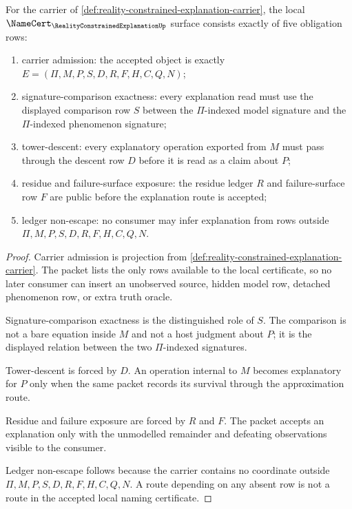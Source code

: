 \begin{theorem}
\label{thm:reality-constrained-explanation-namecert-obligations}
For the carrier of \autoref{def:reality-constrained-explanation-carrier}, the local $\NameCert_{\RealityConstrainedExplanationUp}$ surface consists exactly of five obligation rows:
\begin{enumerate}
\item carrier admission: the accepted object is exactly $E=(\Pi,M,P,S,D,R,F,H,C,Q,N)$;
\item signature-comparison exactness: every explanation read must use the displayed comparison row $S$ between the $\Pi$-indexed model signature and the $\Pi$-indexed phenomenon signature;
\item tower-descent: every explanatory operation exported from $M$ must pass through the descent row $D$ before it is read as a claim about $P$;
\item residue and failure-surface exposure: the residue ledger $R$ and failure-surface row $F$ are public before the explanation route is accepted;
\item ledger non-escape: no consumer may infer explanation from rows outside $\Pi,M,P,S,D,R,F,H,C,Q,N$.
\end{enumerate}
\end{theorem}
\begin{proof}
Carrier admission is projection from \autoref{def:reality-constrained-explanation-carrier}. The packet lists the only rows available to the local certificate, so no later consumer can insert an unobserved source, hidden model row, detached phenomenon row, or extra truth oracle.

Signature-comparison exactness is the distinguished role of $S$. The comparison is not a bare equation inside $M$ and not a host judgment about $P$; it is the displayed relation between the two $\Pi$-indexed signatures.

Tower-descent is forced by $D$. An operation internal to $M$ becomes explanatory for $P$ only when the same packet records its survival through the approximation route.

Residue and failure exposure are forced by $R$ and $F$. The packet accepts an explanation only with the unmodelled remainder and defeating observations visible to the consumer.

Ledger non-escape follows because the carrier contains no coordinate outside $\Pi,M,P,S,D,R,F,H,C,Q,N$. A route depending on any absent row is not a route in the accepted local naming certificate.
\end{proof}

